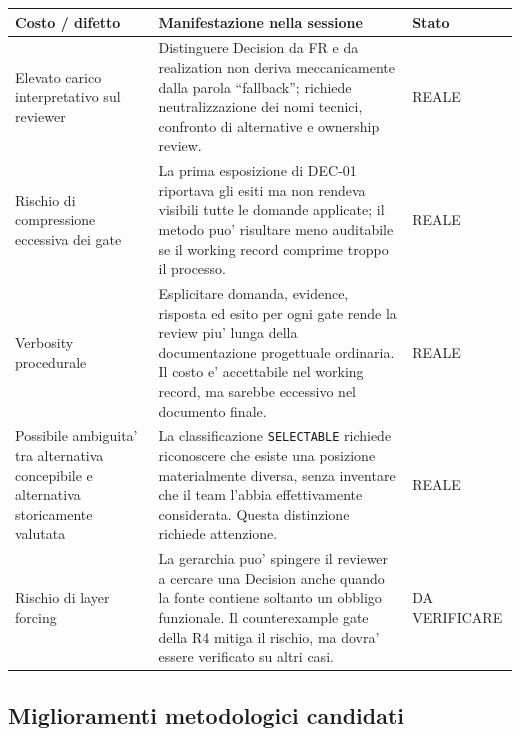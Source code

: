 \documentclass[11pt,a4paper]{article}
\begin{document}
\begin{tabularx}{\textwidth}{L{42mm}Y L{25mm}}
\toprule
\textbf{Costo / difetto} & \textbf{Manifestazione nella sessione} & \textbf{Stato} \\
\midrule
Elevato carico interpretativo sul reviewer & Distinguere Decision da FR e da realization non deriva meccanicamente dalla parola ``fallback''; richiede neutralizzazione dei nomi tecnici, confronto di alternative e ownership review. & REALE \\
Rischio di compressione eccessiva dei gate & La prima esposizione di DEC-01 riportava gli esiti ma non rendeva visibili tutte le domande applicate; il metodo puo' risultare meno auditabile se il working record comprime troppo il processo. & REALE \\
Verbosity procedurale & Esplicitare domanda, evidence, risposta ed esito per ogni gate rende la review piu' lunga della documentazione progettuale ordinaria. Il costo e' accettabile nel working record, ma sarebbe eccessivo nel documento finale. & REALE \\
Possibile ambiguita' tra alternativa concepibile e alternativa storicamente valutata & La classificazione \texttt{SELECTABLE} richiede riconoscere che esiste una posizione materialmente diversa, senza inventare che il team l'abbia effettivamente considerata. Questa distinzione richiede attenzione. & REALE \\
Rischio di layer forcing & La gerarchia puo' spingere il reviewer a cercare una Decision anche quando la fonte contiene soltanto un obbligo funzionale. Il counterexample gate della R4 mitiga il rischio, ma dovra' essere verificato su altri casi. & DA VERIFICARE \\
\bottomrule
\end{tabularx}

\subsection{Miglioramenti metodologici candidati}
\end{document}
